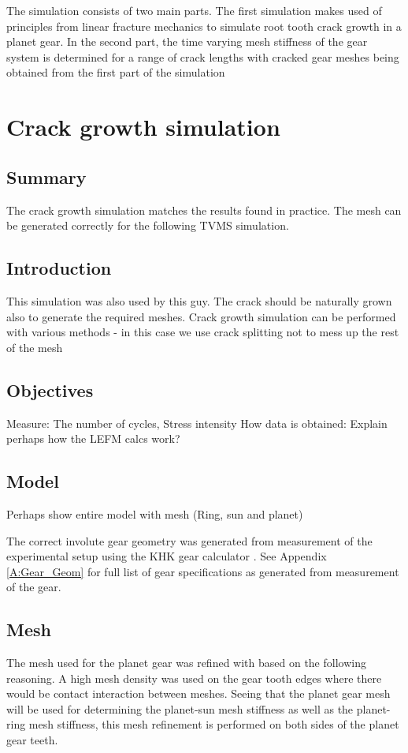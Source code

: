 The simulation consists of two main parts. The first simulation makes used of principles from linear fracture mechanics to simulate root tooth crack growth in a planet gear. In the second part, the time varying mesh stiffness of the gear system is determined for a range of crack lengths with cracked gear meshes being obtained from the first part of the simulation


\section{Crack growth simulation}

\subsection{Summary}
The crack growth simulation matches the results found in practice. The mesh can be generated correctly for the following TVMS simulation.

\subsection{Introduction}
This simulation was also used by this guy. 
The crack should be naturally grown also to generate the required meshes.
Crack growth simulation can be performed with various methods - in this case we use crack splitting not to mess up the rest of the mesh

\subsection{Objectives}
Measure: The number of cycles, Stress intensity
How data is obtained: Explain perhaps how the LEFM calcs work?

\subsection{Model}
Perhaps show entire model with mesh (Ring, sun and planet)

The correct involute gear geometry was generated from measurement of the experimental setup using the KHK gear calculator \cite{KHK2015}. See Appendix \ref{A:Gear_Geom} for full list of gear specifications as generated from measurement of the gear. 


\subsection{Mesh}
The mesh used for the planet gear was refined with based on the following reasoning. A high mesh density was used on the gear tooth edges where there would be contact interaction between meshes. Seeing that the planet gear mesh will be used for determining the planet-sun mesh stiffness as well as the planet-ring mesh stiffness, this mesh refinement is performed on both sides of the planet gear teeth. 

